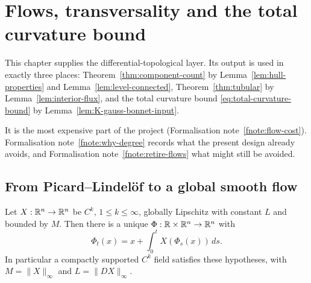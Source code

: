 \chapter{Flows, transversality and the total curvature bound}\label{ch:flows}

This chapter supplies the differential-topological layer.  Its output is used
in exactly three places: Theorem~\ref{thm:component-count} by
Lemma~\ref{lem:hull-properties} and Lemma~\ref{lem:level-connected},
Theorem~\ref{thm:tubular} by Lemma~\ref{lem:interior-flux}, and the total
curvature bound \eqref{eq:total-curvature-bound} by
Lemma~\ref{lem:K-gauss-bonnet-input}.

It is the most expensive part of the project
(Formalisation note~\ref{fnote:flow-cost}).  Formalisation
note~\ref{fnote:why-degree} records what the present design already avoids,
and Formalisation note~\ref{fnote:retire-flows} what might still be avoided.

\section{From Picard--Lindel\"of to a global smooth flow}\label{sec:flow}

\begin{theorem}\label{thm:global-flow}
Let $X:\mathbb R^n\to\mathbb R^n$ be $C^k$, $1\le k\le\infty$, globally Lipschitz with
constant $L$ and bounded by $M$.  Then there is a unique
$\Phi:\mathbb R\times\mathbb R^n\to\mathbb R^n$ with
\begin{equation}\label{eq:flow-integral}
  \Phi_t(x)=x+\int_0^tX(\Phi_s(x))\,ds .
\end{equation}
In particular a compactly supported $C^k$ field satisfies these hypotheses,
with $M=\|X\|_\infty$ and $L=\|DX\|_\infty$.
\end{theorem}

